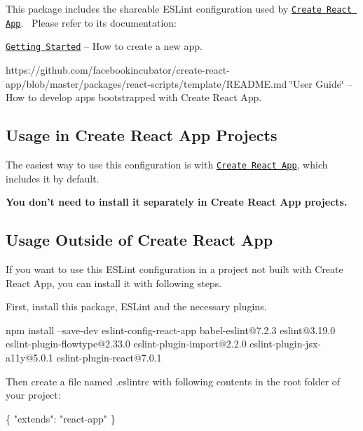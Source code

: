 This package includes the shareable E\+S\+Lint configuration used by \href{https://github.com/facebookincubator/create-react-app}{\tt Create React App}.~\newline
 Please refer to its documentation\+:


\begin{DoxyItemize}
\item \href{https://github.com/facebookincubator/create-react-app/blob/master/README.md#getting-started}{\tt Getting Started} – How to create a new app.
\item https\+://github.com/facebookincubator/create-\/react-\/app/blob/master/packages/react-\/scripts/template/\+R\+E\+A\+D\+M\+E.\+md \char`\"{}\+User Guide\char`\"{} – How to develop apps bootstrapped with Create React App.
\end{DoxyItemize}

\subsection*{Usage in Create React App Projects}

The easiest way to use this configuration is with \href{https://github.com/facebookincubator/create-react-app}{\tt Create React App}, which includes it by default.

{\bfseries You don’t need to install it separately in Create React App projects.}

\subsection*{Usage Outside of Create React App}

If you want to use this E\+S\+Lint configuration in a project not built with Create React App, you can install it with following steps.

First, install this package, E\+S\+Lint and the necessary plugins.


\begin{DoxyCode}
npm install --save-dev eslint-config-react-app babel-eslint@7.2.3 eslint@3.19.0
       eslint-plugin-flowtype@2.33.0 eslint-plugin-import@2.2.0 eslint-plugin-jsx-a11y@5.0.1 eslint-plugin-react@7.0.1
\end{DoxyCode}


Then create a file named {\ttfamily .eslintrc} with following contents in the root folder of your project\+:


\begin{DoxyCode}
\{
  "extends": "react-app"
\}
\end{DoxyCode}


